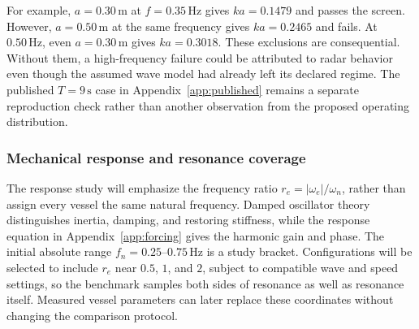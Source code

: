 \documentclass[10pt,letterpaper]{article}
\begin{document}
For example, $a=0.30\,\mathrm{m}$ at $f=0.35\,\mathrm{Hz}$ gives $ka=0.1479$ and passes the screen. However, $a=0.50\,\mathrm{m}$ at the same frequency gives $ka=0.2465$ and fails. At $0.50\,\mathrm{Hz}$, even $a=0.30\,\mathrm{m}$ gives $ka=0.3018$. These exclusions are consequential. Without them, a high-frequency failure could be attributed to radar behavior even though the assumed wave model had already left its declared regime. The published $T=9\,\mathrm{s}$ case in Appendix~\ref{app:published} remains a separate reproduction check rather than another observation from the proposed operating distribution.

\subsubsection{Mechanical response and resonance coverage}

The response study will emphasize the frequency ratio $r_e=|\omega_e|/\omega_n$, rather than assign every vessel the same natural frequency. Damped oscillator theory distinguishes inertia, damping, and restoring stiffness, while the response equation in Appendix~\ref{app:forcing} gives the harmonic gain and phase. \cite{MITOCW2011DampedOscillator} The initial absolute range $f_n=0.25$--$0.75\,\mathrm{Hz}$ is a study bracket. Configurations will be selected to include $r_e$ near $0.5$, $1$, and $2$, subject to compatible wave and speed settings, so the benchmark samples both sides of resonance as well as resonance itself. Measured vessel parameters can later replace these coordinates without changing the comparison protocol.
\end{document}
